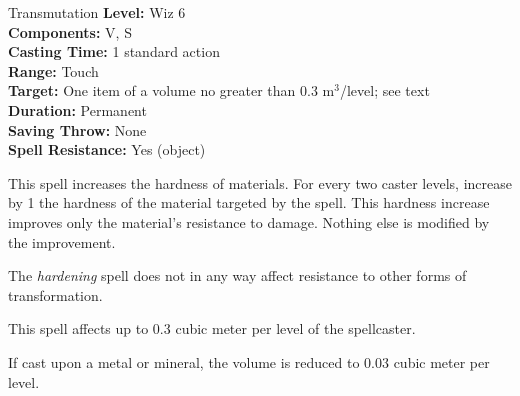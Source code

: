 {Transmutation}
{
	\textbf{Level:} Wiz 6\\	
	\textbf{Components:} V, S\\	
	\textbf{Casting Time:} 1 standard action\\	
	\textbf{Range:} Touch\\	
	\textbf{Target:} One item of a volume no greater than 0.3 m$^3$/level; see text\\
	\textbf{Duration:} Permanent\\	
	\textbf{Saving Throw:} None\\	
	\textbf{Spell Resistance:} Yes (object)\\
}
{
	This spell increases the hardness of materials. For every two caster levels, increase by 1 the hardness of the material targeted by the spell. This hardness increase improves only the material's resistance to damage. Nothing else is modified by the improvement.

	The \emph{hardening} spell does not in any way affect resistance to other forms of transformation.

	This spell affects up to 0.3 cubic meter per level of the spellcaster.

	If cast upon a metal or mineral, the volume is reduced to 0.03 cubic meter per level.
}
